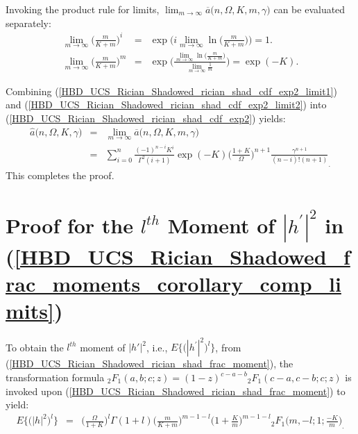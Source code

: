 Invoking the product rule for limits, $\lim_{m\to\infty} \overline{a}\big(n,\Omega,K,m,\gamma\big)$ can be evaluated separately:
\begin{eqnarray} 
\lim_{m \to \infty} \bigg(\frac{m}{K+m}\bigg)^{i} & = & \exp\Bigg(i \lim_{m \to \infty} \ln\bigg(\frac{m}{K+m}\bigg)\Bigg) = 1. \label{HBD_UCS_Rician_Shadowed_rician_shad_cdf_exp2_limit1} \\
\lim_{m \to \infty} \bigg(\frac{m}{K+m}\bigg)^{m} & = & \exp\Bigg(\frac{\lim_{m\to\infty}\ln\big(\frac{m}{K+m}\big)}{\lim_{m\to\infty}\frac{1}{m}}\Bigg) = \exp(-K). \label{HBD_UCS_Rician_Shadowed_rician_shad_cdf_exp2_limit2}
\end{eqnarray}

Combining (\ref{HBD_UCS_Rician_Shadowed_rician_shad_cdf_exp2_limit1}) and (\ref{HBD_UCS_Rician_Shadowed_rician_shad_cdf_exp2_limit2}) into (\ref{HBD_UCS_Rician_Shadowed_rician_shad_cdf_exp2}) yields:
\begin{eqnarray} \label{HBD_UCS_Rician_Shadowed_cdf_theorem_comp_limits}
\widehat{a}\big(n,\Omega,K,\gamma\big) & = & \lim_{m\to\infty} \overline{a}\big(n,\Omega,K,m,\gamma\big) \nonumber\\
 & = &  \sum_{i=0}^n \frac{(-1)^{n-i} K^i}{\Gamma^2(i+1)} \exp(-K) \bigg(\frac{1+K}{\Omega}\bigg)^{n+1} \frac{\gamma^{n+1}}{(n-i)!(n+1)}_.
\end{eqnarray}
This completes the proof.

\section{Proof for the $l^{th}$ Moment of $|h^{'}|^2$ in (\ref{HBD_UCS_Rician_Shadowed_frac_moments_corollary_comp_limits})} \label{HBD_UCS_Rician_Shadowed_frac_moments_corollary_proof}
To obtain the $l^{th}$ moment of $|h'|^2$, i.e., $E\big\{\big(|h^{'}|^2\big)^l\big\}$, from (\ref{HBD_UCS_Rician_Shadowed_rician_shad_frac_moment}), the transformation formula ${}_2F_1(a,b;c;z) = (1-z)^{c-a-b}{}_2F_1(c-a,c-b;c;z)$ \cite{gradshteyn2014table} is invoked upon (\ref{HBD_UCS_Rician_Shadowed_rician_shad_frac_moment}) to yield:
\begin{eqnarray} \label{HBD_UCS_Rician_Shadowed_rician_shad_frac_moment2}
E\big\{\big(|h|^2\big)^l\big\} & = & \bigg(\frac{\Omega}{1+K}\bigg)^l \Gamma(1+l) \bigg(\frac{m}{K+m}\bigg)^{m-1-l} \bigg(1+\frac{K}{m}\bigg)^{m-1-l} {}_2F_1\bigg(m,-l;1;\frac{-K}{m}\bigg)_.
\end{eqnarray}

